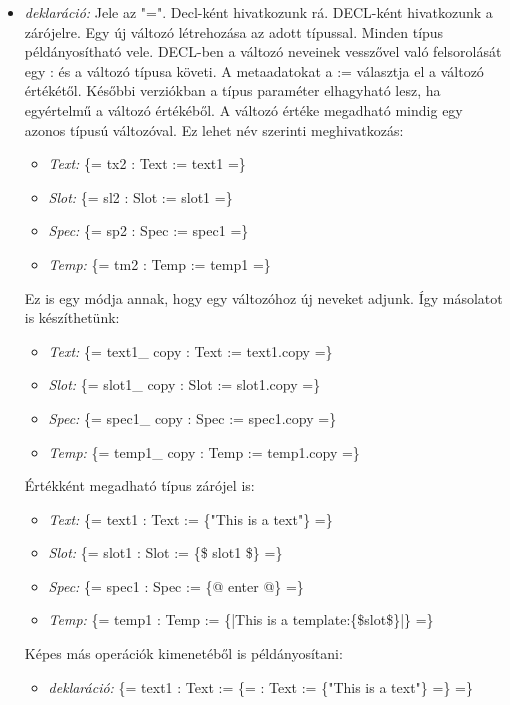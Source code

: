 \begin{itemize}
\item \emph{deklaráció:} 
Jele az "=".
Decl-ként hivatkozunk rá.
DECL-ként hivatkozunk a zárójelre. 
Egy új változó létrehozása az adott típussal.
Minden típus példányosítható vele.
DECL-ben  a változó neveinek vesszővel való felsorolását egy : és a változó típusa követi. 
A metaadatokat a := választja el a változó értékétől.
Későbbi verziókban a típus paraméter elhagyható lesz, ha egyértelmű a változó értékéből. 
A változó értéke megadható mindig egy azonos típusú változóval.
Ez lehet név szerinti meghivatkozás:
\begin{itemize}
\item\emph{Text:} \{= tx2 : Text := text1 =\}
\item\emph{Slot:} \{= sl2 : Slot := slot1 =\}
\item\emph{Spec:} \{= sp2 : Spec := spec1 =\}
\item\emph{Temp:} \{= tm2 : Temp := temp1 =\}
\end{itemize}
Ez is egy módja annak, hogy egy változóhoz új neveket adjunk.
Így másolatot is készíthetünk: 
\begin{itemize}
\item\emph{Text:} \{= text1\_ copy : Text := text1.copy =\}
\item\emph{Slot:} \{= slot1\_ copy : Slot := slot1.copy =\}
\item\emph{Spec:} \{= spec1\_ copy : Spec := spec1.copy =\}
\item\emph{Temp:} \{= temp1\_ copy : Temp := temp1.copy =\}
\end{itemize}
Értékként megadható típus zárójel is: 
\begin{itemize}
\item\emph{Text:} \{= text1 : Text := \{"This is a text"\} =\}
\item\emph{Slot:} \{= slot1 : Slot := \{\$ slot1 \$\} =\}
\item\emph{Spec:} \{= spec1 : Spec := \{@ enter @\} =\}
\item\emph{Temp:} \{= temp1 : Temp := \{|This is a template:\{\$slot\$\}|\} =\}
\end{itemize}
Képes más operációk kimenetéből is példányosítani:
\begin{itemize}
\item\emph{deklaráció:} \{= text1 : Text := \{= : Text := \{"This is a text"\} =\} =\}

\end{itemize}
\end{itemize}
